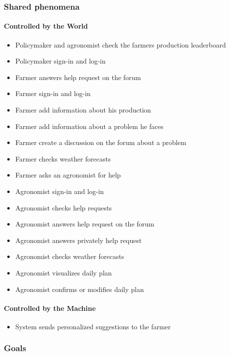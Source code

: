 \subsubsection{Shared phenomena}
\paragraph{Controlled by the World}
\begin{itemize}
    \item Policymaker and agronomist check the farmers production leaderboard
    \item Policymaker sign-in and log-in
    \item Farmer answers help request on the forum
    \item Farmer sign-in and log-in 
    \item Farmer add information about his production
    \item Farmer add information about a problem he faces
    \item Farmer create a discussion on the forum about a problem
    \item Farmer checks weather forecasts
    \item Farmer asks an agronomist for help
    \item Agronomist sign-in and log-in
    \item Agronomist checks help requests
    \item Agronomist answers help request on the forum
    \item Agronomist answers privately help request
    \item Agronomist checks weather forecasts
    \item Agronomist visualizes daily plan
    \item Agronomist confirms or modifies daily plan
\end{itemize}

\paragraph{Controlled by the Machine}
\begin{itemize}
    \item System sends personalized suggestions to the farmer
\end{itemize}

\subsubsection{Goals}

